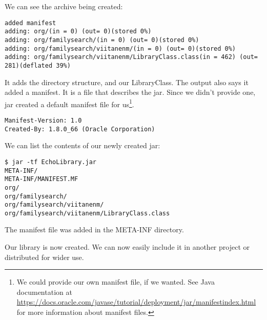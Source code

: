 We can see the archive being created:

\begin{lstlisting}
added manifest
adding: org/(in = 0) (out= 0)(stored 0%)
adding: org/familysearch/(in = 0) (out= 0)(stored 0%)
adding: org/familysearch/viitanenm/(in = 0) (out= 0)(stored 0%)
adding: org/familysearch/viitanenm/LibraryClass.class(in = 462) (out= 281)(deflated 39%)
\end{lstlisting}

It adds the directory structure, and our LibraryClass. The output also says it added a manifest.	 It is a file that describes the jar. Since we didn't provide one, jar created a default manifest file for us\footnote{We could provide our own manifest file, if we wanted. See Java documentation at \url{https://docs.oracle.com/javase/tutorial/deployment/jar/manifestindex.html} for more information about manifest files.}.
\begin{lstlisting}
Manifest-Version: 1.0
Created-By: 1.8.0_66 (Oracle Corporation)
\end{lstlisting}

We can list the contents of our newly created jar:
\begin{lstlisting}
$ jar -tf EchoLibrary.jar
META-INF/
META-INF/MANIFEST.MF
org/
org/familysearch/
org/familysearch/viitanenm/
org/familysearch/viitanenm/LibraryClass.class
\end{lstlisting}

The manifest file was added in the META-INF directory.

Our library is now created. We can now easily include it in another project or distributed for wider use.